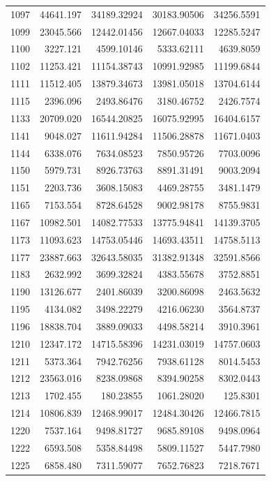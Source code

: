 \documentclass[
  12pt,
]{article}
\begin{document}
\begin{longtable}[]{@{}lrrrr@{}}
1097 & 44641.197 & 34189.32924 & 30183.90506 & 34256.5591 \\
1099 & 23045.566 & 12442.01456 & 12667.04033 & 12285.5247 \\
1100 & 3227.121 & 4599.10146 & 5333.62111 & 4639.8059 \\
1102 & 11253.421 & 11154.38743 & 10991.92985 & 11199.6844 \\
1111 & 11512.405 & 13879.34673 & 13981.05018 & 13704.6144 \\
1115 & 2396.096 & 2493.86476 & 3180.46752 & 2426.7574 \\
1133 & 20709.020 & 16544.20825 & 16075.92995 & 16404.6157 \\
1141 & 9048.027 & 11611.94284 & 11506.28878 & 11671.0403 \\
1144 & 6338.076 & 7634.08523 & 7850.95726 & 7703.0096 \\
1150 & 5979.731 & 8926.73763 & 8891.31491 & 9003.2094 \\
1151 & 2203.736 & 3608.15083 & 4469.28755 & 3481.1479 \\
1165 & 7153.554 & 8728.64528 & 9002.98178 & 8755.9831 \\
1167 & 10982.501 & 14082.77533 & 13775.94841 & 14139.3705 \\
1173 & 11093.623 & 14753.05446 & 14693.43511 & 14758.5113 \\
1177 & 23887.663 & 32643.58035 & 31382.91348 & 32591.8566 \\
1183 & 2632.992 & 3699.32824 & 4383.55678 & 3752.8851 \\
1190 & 13126.677 & 2401.86039 & 3200.86098 & 2463.5632 \\
1195 & 4134.082 & 3498.22279 & 4216.06230 & 3564.8737 \\
1196 & 18838.704 & 3889.09033 & 4498.58214 & 3910.3961 \\
1210 & 12347.172 & 14715.58396 & 14231.03019 & 14757.0603 \\
1211 & 5373.364 & 7942.76256 & 7938.61128 & 8014.5453 \\
1212 & 23563.016 & 8238.09868 & 8394.90258 & 8302.0443 \\
1213 & 1702.455 & 180.23855 & 1061.28020 & 125.8301 \\
1214 & 10806.839 & 12468.99017 & 12484.30426 & 12466.7815 \\
1220 & 7537.164 & 9498.81727 & 9685.89108 & 9498.0964 \\
1222 & 6593.508 & 5358.84498 & 5809.11527 & 5447.7980 \\
1225 & 6858.480 & 7311.59077 & 7652.76823 & 7218.7671 \\

\end{longtable}
\end{document}
